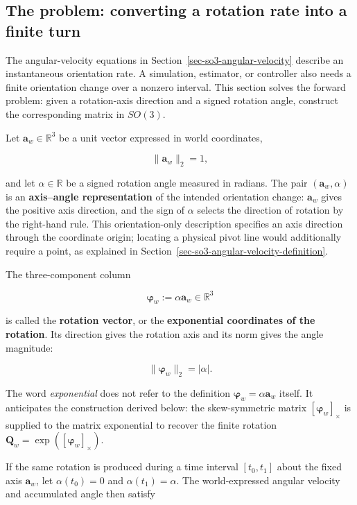 \documentclass[
  australian,
  12pt,
  letterpaper,
  DIV=11,
  numbers=noendperiod,
  twoside]{scrreprt}
\begin{document}
\subsection{The problem: converting a rotation rate into a finite
turn}\label{the-problem-converting-a-rotation-rate-into-a-finite-turn}

The angular-velocity equations in Section~\ref{sec-so3-angular-velocity}
describe an instantaneous orientation rate. A simulation, estimator, or
controller also needs a finite orientation change over a nonzero
interval. This section solves the forward problem: given a rotation-axis
direction and a signed rotation angle, construct the corresponding
matrix in \(SO(3)\).

Let \(\mathbf a_w\in\mathbb R^3\) be a unit vector expressed in world
coordinates,

\[
\|\mathbf a_w\|_2=1,
\]

and let \(\alpha\in\mathbb R\) be a signed rotation angle measured in
radians. The pair \((\mathbf a_w,\alpha)\) is an \textbf{axis--angle
representation} of the intended orientation change: \(\mathbf a_w\)
gives the positive axis direction, and the sign of \(\alpha\) selects
the direction of rotation by the right-hand rule. This orientation-only
description specifies an axis direction through the coordinate origin;
locating a physical pivot line would additionally require a point, as
explained in Section~\ref{sec-so3-angular-velocity-definition}.

The three-component column

\[
\boxed{
\boldsymbol\varphi_w
\mathrel{:=}
\alpha\mathbf a_w
\in\mathbb R^3
}
\]

is called the \textbf{rotation vector}, or the \textbf{exponential
coordinates of the rotation}. Its direction gives the rotation axis and
its norm gives the angle magnitude:

\[
\|\boldsymbol\varphi_w\|_2
=
|\alpha|.
\]

The word \emph{exponential} does not refer to the definition
\(\boldsymbol\varphi_w=\alpha\mathbf a_w\) itself. It anticipates the
construction derived below: the skew-symmetric matrix
\([\boldsymbol\varphi_w]_\times\) is supplied to the matrix exponential
to recover the finite rotation
\(\mathbf Q_w=\exp([\boldsymbol\varphi_w]_\times)\).

If the same rotation is produced during a time interval \([t_0,t_1]\)
about the fixed axis \(\mathbf a_w\), let \(\alpha(t_0)=0\) and
\(\alpha(t_1)=\alpha\). The world-expressed angular velocity and
accumulated angle then satisfy
\end{document}
